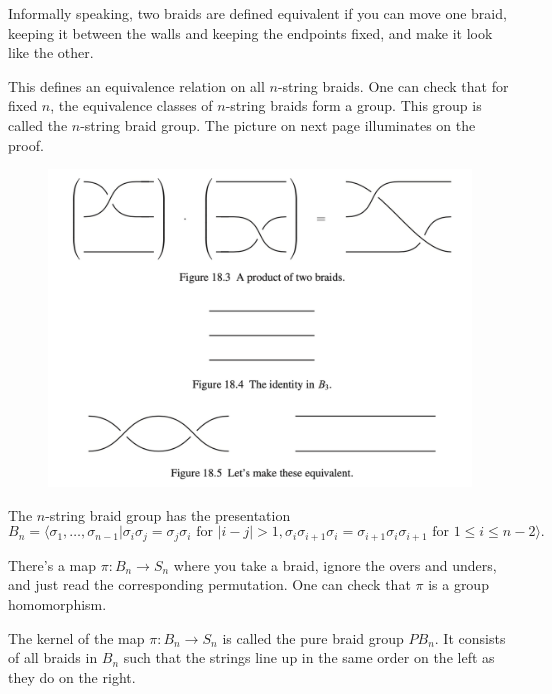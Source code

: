 \documentclass{article}
\begin{document}
\begin{definition}
Informally speaking, two braids are defined equivalent if you can move one braid, keeping it between the walls and keeping the endpoints fixed, and make it look like the other. 
\end{definition}

This defines an equivalence relation on all $n$-string braids. One can check that for fixed $n$, the equivalence classes of $n$-string braids form a group. This group is called the $n$-string braid group. The picture on next page illuminates on the proof. 
\begin{figure}[hbt!]
\label{fig:bb}
\small
\centering
\includegraphics[scale = 0.5]{Pics/3.png}
\end{figure}
\leavevmode

\begin{definition}
The $n$-string braid group has the presentation
\[
B_{n} = \langle \sigma_{1}, \ldots, \sigma_{n - 1}| \sigma_{i} \sigma_{j} = \sigma_{j} \sigma_{i} \text{ for $|i - j| > 1$}, \sigma_{i} \sigma_{i + 1} \sigma_{i} = \sigma_{i + 1} \sigma_{i} \sigma_{i + 1} \text{ for $1 \leq i \leq n - 2$} 
\rangle.
\]
\end{definition}

There's a map $\pi: B_{n} \rightarrow S_{n}$ where you take a braid, ignore the overs and unders, and just read the corresponding permutation. One can check that $\pi$ is a group homomorphism. 
 
\begin{definition}
The kernel of the map $\pi: B_{n} \rightarrow S_{n}$ is called the pure braid group $PB_{n}$. It consists of all braids in $B_{n}$ such that the strings line up in the same order on the left as they do on the right.
\end{definition}
\end{document}
